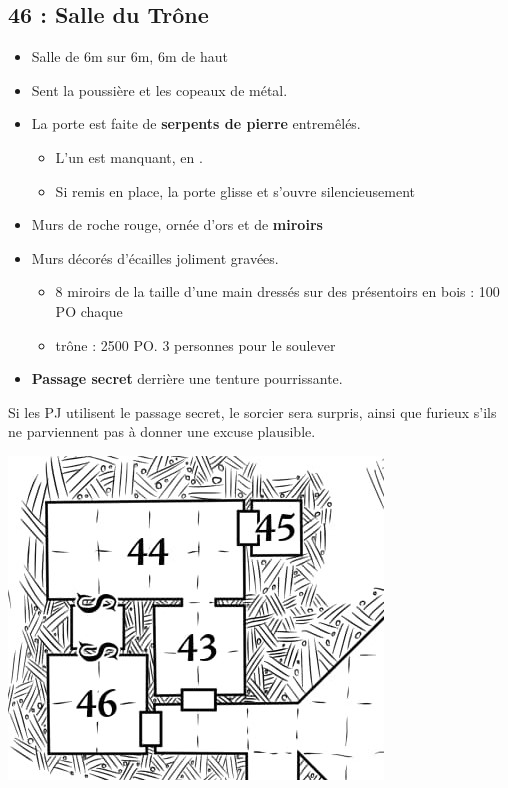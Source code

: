 \subsection{46 : Salle du Trône}\label{n3:s46}
\begin{itemize}
  \item Salle de 6m sur 6m, 6m de haut 
  \item Sent la poussière et les copeaux de métal.
  \item La porte est faite de \textbf{serpents de pierre} entremêlés. 
  \begin{itemize}
    \item L’un est manquant, en \textbf{}.
    \item Si remis en place, la porte glisse et s'ouvre silencieusement
  \end{itemize}
  \item Murs de roche rouge, ornée d'ors et de \textbf{miroirs} 
  \item Murs décorés d’écailles joliment gravées. 
  \begin{itemize}
    \item 8 miroirs de la taille d’une main dressés sur des présentoirs en bois : 100 PO chaque
    \item trône : 2500 PO.  3 personnes pour le soulever
  \end{itemize}
  \item \textbf{Passage secret} derrière une tenture pourrissante.
\end{itemize}

Si les PJ utilisent le passage secret, le sorcier sera surpris, ainsi que furieux s’ils ne parviennent pas à donner une excuse plausible.

\vfill
\pagebreak
\includegraphics[width=\columnwidth]{pics/map_43-46.jpg}
